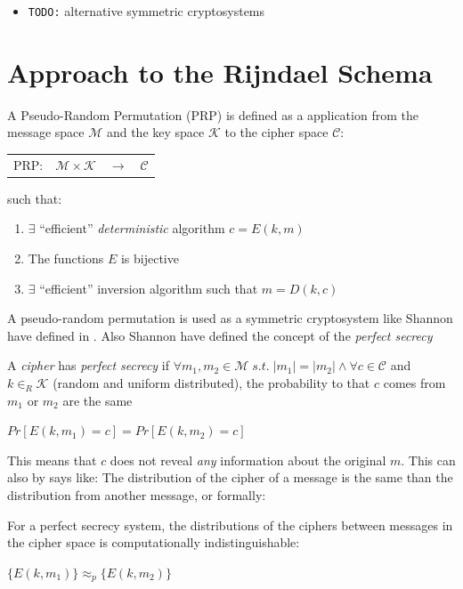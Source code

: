 \documentclass[10pt,a4paper,twoside]{llncs}
\begin{document}
\begin{itemize}
 \item \texttt{TODO:} alternative symmetric cryptosystems
\end{itemize}

\section{Approach to the Rijndael Schema}\label{sec:approach}
\begin{definition}\label{def:PRP}
 A Pseudo-Random Permutation (PRP) is defined as a application from the message space $\mathcal{M}$ and the key space $\mathcal{K}$ to the cipher space $\mathcal{C}$:
 \begin{center}
  \begin{tabular}{llll}
   PRP: & $\mathcal{M} \times \mathcal{K}$ & $\rightarrow$ & $\mathcal{C}$ \\
  \end{tabular}
 \end{center}
 such that:
 \begin{enumerate}
  \item $\exists$ ``efficient'' \emph{deterministic} algorithm $c=E(k,m)$
  \item The functions $E$ is bijective
  \item $\exists$ ``efficient'' inversion algorithm such that $m=D(k,c)$
 \end{enumerate}
\end{definition}

A pseudo-random permutation is used as a symmetric cryptosystem like Shannon have defined in \cite{shannon-comTheorySecSys}. Also Shannon have defined the concept of the \emph{perfect secrecy}
\begin{definition}\label{def:shannonPerfectSecrecy}
 A \emph{cipher} has \emph{perfect secrecy} if $\forall m_1, m_2 \in \mathcal{M} \;s.t.\; \left| m_1 \right| = \left| m_2 \right| \wedge \forall c \in \mathcal{C}$ and  $k\in_R\mathcal{K}$ (random and uniform distributed), the probability to that $c$ comes from $m_1$ or $m_2$ are the same
 \begin{center}
  $Pr[E(k,m_1)=c] = Pr[E(k,m_2)=c]$
 \end{center}
\end{definition}

This means that $c$ does not reveal \emph{any} information about the original $m$. This can also by says like: The distribution of the cipher of a message is the same than the distribution from another message, or formally:
\begin{definition}
 For a perfect secrecy system, the distributions of the ciphers between messages in the cipher space is computationally indistinguishable:
 \begin{center}
  $\{ E(k,m_1) \} \approx_p \{ E(k,m_2) \} $
 \end{center}
\end{definition}
\end{document}
